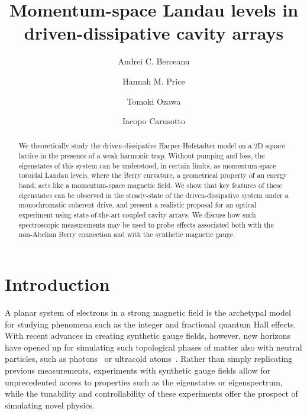 \documentclass[twocolumn, 10pt, aps, superscriptaddress, floatfix, showpacs, pra, citeautoscript]{revtex4-1}
\begin{document}
\title{Momentum-space Landau levels in driven-dissipative cavity arrays}


\author{Andrei C. Berceanu}
\author{Hannah M. Price}
\author{Tomoki Ozawa}
\author{Iacopo Carusotto}

\begin{abstract}
  We theoretically study the driven-dissipative Harper-Hofstadter model on a
  2D square lattice in the presence of a weak harmonic trap. Without pumping and loss, the eigenstates of this system can be understood, in certain limits, as momentum-space toroidal Landau levels, where the Berry curvature, a geometrical property of an energy band, acts like a momentum-space magnetic field. We show that key features of these eigenstates can be observed in the  steady-state of the driven-dissipative system under a monochromatic coherent drive, and present a realistic proposal for an optical experiment using state-of-the-art coupled cavity arrays. We discuss how such spectroscopic measurements may be used to probe effects associated both with the non-Abelian Berry connection and with the synthetic magnetic gauge.
\end{abstract}

\maketitle


\section{Introduction}

A planar system of electrons in a
strong magnetic field is the archetypal model for studying phenomena such as the
integer and fractional quantum Hall effects. With recent advances in creating
synthetic gauge fields, however, new horizons have opened up for simulating such topological phases of matter also with neutral particles, such as photons~\cite{hafezi2014synthetic} or ultracold atoms~\cite{dalibardrmp2011, goldman_repprog_2014, Goldman_arxiv_2015}. 
Rather than simply replicating previous measurements, experiments with synthetic gauge fields allow for unprecedented access to properties such as the eigenstates or eigenspectrum, while the tunability and controllability of these experiments offer the prospect of simulating novel physics. 
\end{document}
